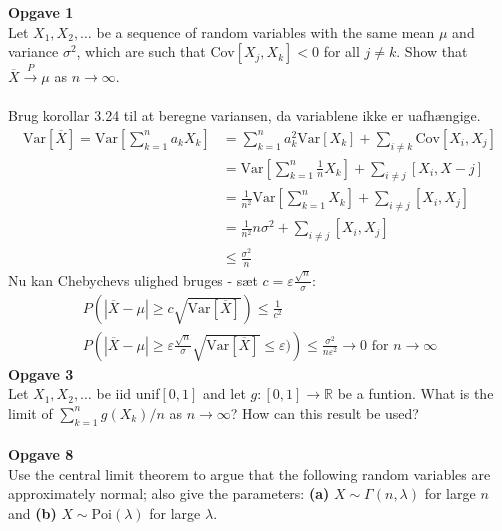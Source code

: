 \documentclass[12pt,a4paper,draft]{report}
\author{Frederik Appel Vardinghus-Nielsen}
\begin{document}
\noindent\textbf{Opgave 1}\\
Let $X_1,X_2,\ldots$ be a sequence of random variables with the same mean $\mu$ and variance $\sigma^2$, which are such that Cov$[X_j,X_k]<0$ for all $j\neq k$. Show that $\overline{X}\overset{P}\to\mu$ as $n\to\infty$.\\\\
Brug korollar 3.24 til at beregne variansen, da variablene ikke er uafhængige.
\begin{align*}
\text{Var}[\overline{X}]=\text{Var}\left[\sum_{k=1}^na_kX_k\right]&=\sum_{k=1}^na_k^2\text{Var}[X_k]+\sum_{i\neq k}\text{Cov}[X_i,X_j]\\
&=\text{Var}\left[\sum_{k=1}^n\frac{1}{n}X_k\right]+\sum_{i\neq j}[X_i,X-j]\\
&=\frac{1}{n^2}\text{Var}\left[\sum_{k=1}^nX_k\right]+\sum_{i\neq j}[X_i,X_j]\\
&=\frac{1}{n^2}n\sigma^2+\sum_{i\neq j}[X_i,X_j]\\
&\leq\frac{\sigma^2}{n}
\end{align*}
Nu kan Chebychevs ulighed bruges - sæt $c=\varepsilon\frac{\sqrt{n}}{\sigma}$:
\begin{align*}
P\left(|\overline{X}-\mu|\geq c\sqrt{\text{Var}[\overline{X}]}\right)\leq\frac{1}{c^2}\\
P\left(|\overline{X}-\mu|\geq \varepsilon\frac{\sqrt{n}}{\sigma}\sqrt{\text{Var}[\overline{X}]}\leq \varepsilon)\right)\leq\frac{\sigma^2}{n\varepsilon^2}\to 0\text{ for }n\to\infty
\end{align*}
\textbf{Opgave 3}\\
Let $X_1,X_2,\ldots$ be iid unif$[0,1]$ and let $g:[0,1]\to\mathbb{R}$ be a funtion. What is the limit of $\sum_{k=1}^ng(X_k)/n$ as $n\to\infty$? How can this result be used?\\\\
\textbf{Opgave 8}\\
Use the central limit theorem to argue that the following random variables are approximately normal; also give the parameters: \textbf{(a)} $X\sim\Gamma(n,\lambda)$ for large $n$ and \textbf{(b)} $X\sim\text{Poi}(\lambda)$ for large $\lambda$.
\end{document}
